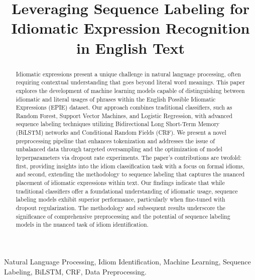 \documentclass[conference]{IEEEtran}
\title{Leveraging Sequence Labeling for Idiomatic Expression Recognition in English Text}
\author{\IEEEauthorblockN{Aaron Pradhan}
	\IEEEauthorblockA{\today}}  %
\begin{document}
\maketitle

\begin{abstract}
Idiomatic expressions present a unique challenge in natural language processing, often requiring contextual understanding that goes beyond literal word meanings. This paper explores the development of machine learning models capable of distinguishing between idiomatic and literal usages of phrases within the English Possible Idiomatic Expressions (EPIE) dataset. Our approach combines traditional classifiers, such as Random Forest, Support Vector Machines, and Logistic Regression, with advanced sequence labeling techniques utilizing Bidirectional Long Short-Term Memory (BiLSTM) networks and Conditional Random Fields (CRF). We present a novel preprocessing pipeline that enhances tokenization and addresses the issue of unbalanced data through targeted oversampling and the optimization of model hyperparameters via dropout rate experiments. The paper's contributions are twofold: first, providing insights into the idiom classification task with a focus on formal idioms, and second, extending the methodology to sequence labeling that captures the nuanced placement of idiomatic expressions within text. Our findings indicate that while traditional classifiers offer a foundational understanding of idiomatic usage, sequence labeling models exhibit superior performance, particularly when fine-tuned with dropout regularization. The methodology and subsequent results underscore the significance of comprehensive preprocessing and the potential of sequence labeling models in the nuanced task of idiom identification.
\end{abstract}

\begin{IEEEkeywords}
Natural Language Processing, Idiom Identification, Machine Learning, Sequence Labeling, BiLSTM, CRF, Data Preprocessing.
\end{IEEEkeywords}
\end{document}
